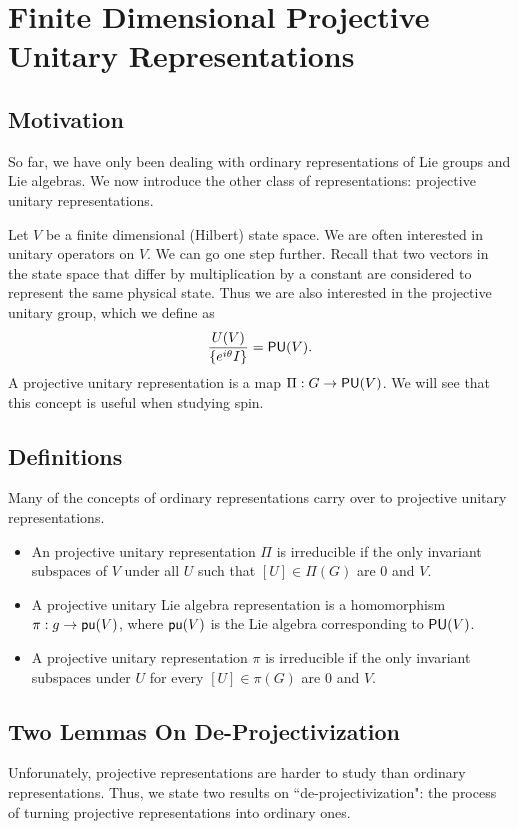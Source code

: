 \section{Finite Dimensional Projective Unitary Representations}
\subsection{Motivation}
So far, we have only been dealing with ordinary representations of Lie groups and Lie algebras. We now introduce the other class of representations: projective unitary representations.

Let $V$ be a finite dimensional (Hilbert) state space. We are often interested in unitary operators on $V$. We can go one step further. Recall that two vectors in the state space that differ by multiplication by a constant are considered to represent the same physical state. Thus we are also interested in the projective unitary group, which we define as
\[
    \frac{U(V)}{\{e^{i\theta}I\}} = \operatorname{\textsf{PU}}(V).
\]
A projective unitary representation is a map $\Pi: G \rightarrow \operatorname{\textsf{PU}}(V)$. We will see that this concept is useful when studying spin.

\subsection{Definitions}
Many of the concepts of ordinary representations carry over to projective unitary representations.
\begin{itemize}
    \item An projective unitary representation $\Pi$ is irreducible if the only invariant subspaces of $V$ under all $U$ such that $[U] \in \Pi(G)$ are $0$ and $V$.
    \item A projective unitary Lie algebra representation is a homomorphism $\mathfrak\pi: g \rightarrow \operatorname{\textsf{pu}}(V)$, where $\operatorname{\textsf{pu}}(V)$ is the Lie algebra corresponding to $\operatorname{\textsf{PU}}(V)$.
    \item A projective unitary representation $\pi$ is irreducible if the only invariant subspaces under $U$ for every $[U] \in \pi(G)$ are $0$ and $V$.
\end{itemize}

\subsection{Two Lemmas On De-Projectivization}
Unforunately, projective representations are harder to study than ordinary representations. Thus, we state two results on ``de-projectivization": the process of turning projective representations into ordinary ones.

